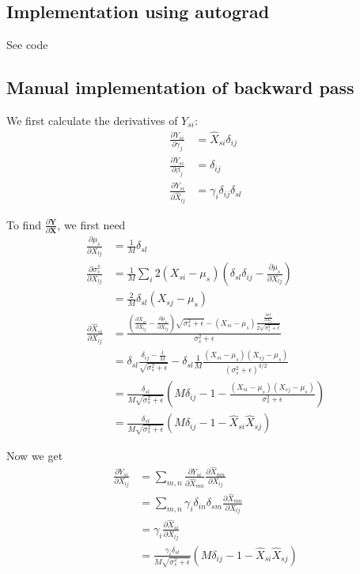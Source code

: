 \documentclass{article}
\newcommand{\pd}[2]{\frac{\partial #1}{\partial #2}}
\begin{document}
\subsection{Implementation using autograd}
See code
\subsection{Manual implementation of backward pass}
We first calculate the derivatives of \(Y_{si}\):
\begin{align*}
\pd{Y_{si}}{\gamma_j} &= \hat{X}_{si}\delta_{ij}\\
\pd{Y_{si}}{\beta_j} &= \delta_{ij}\\
\pd{Y_{si}}{\hat{X}_{lj}} &= \gamma_i \delta_{ij}\delta_{sl}
\end{align*}

To find \(\pd{\bm Y}{\bm X}\), we first need
\begin{align*}
  \pd{\mu_s}{X_{lj}} &= \frac{1}{M}\delta_{sl}\\
  \pd{\sigma_s^2}{X_{lj}} &= \frac{1}{M}\sum_i 2(X_{si} - \mu_s) (\delta_{sl}\delta_{ij} - \pd{\mu_s}{X_{lj}})\\
                     &= \frac{2}{M}\delta_{sl} (X_{sj} - \mu_s)\\
  \pd{\hat{X}_{si}}{X_{lj}} &= \frac{(\pd{X_{si}}{X_{lj}} - \pd{\mu_s}{X_{lj}})\sqrt{\sigma_s^2 + \epsilon}
                              - (X_{si} - \mu_s) \frac{\pd{\sigma_s^2}{X_{lj}}}{2\sqrt{\sigma_s^2 + \epsilon}}}
                              {\sigma_s^2 + \epsilon}\\
                     &= \delta_{sl}\frac{\delta_{ij} - \frac{1}{M}}{\sqrt{\sigma_s^2 + \epsilon}} - \delta_{sl}\frac{1}{M}
                       \frac{(X_{si} - \mu_s)(X_{sj} - \mu_s)}{(\sigma_s^2 + \epsilon)^{3/2}}\\
  &= \frac{\delta_{sl}}{M\sqrt{\sigma_s^2 + \epsilon}}\left(M \delta_{ij} - 1 - \frac{(X_{si} - \mu_s)(X_{sj} - \mu_s)}{\sigma_s^2 + \epsilon}\right)\\
  &= \frac{\delta_{sl}}{M\sqrt{\sigma_s^2 + \epsilon}}\left(M \delta_{ij} - 1 - \hat{X}_{si}\hat{X}_{sj}\right)
\end{align*}

Now we get
\begin{align*}
  \pd{Y_{si}}{X_{lj}} &= \sum_{m, n} \pd{Y_{si}}{\hat{X}_{mn}}\pd{\hat{X}_{mn}}{X_{lj}}\\
                      &= \sum_{m, n}\gamma_i\delta_{in}\delta_{sm}\pd{\hat{X}_{mn}}{X_{lj}}\\
                      &= \gamma_i \pd{\hat{X}_{si}}{X_{lj}}\\
  &= \frac{\gamma_i \delta_{sl}}{M\sqrt{\sigma_s^2 + \epsilon}}\left(M \delta_{ij} - 1 - \hat{X}_{si}\hat{X}_{sj}\right)
\end{align*}
\end{document}

